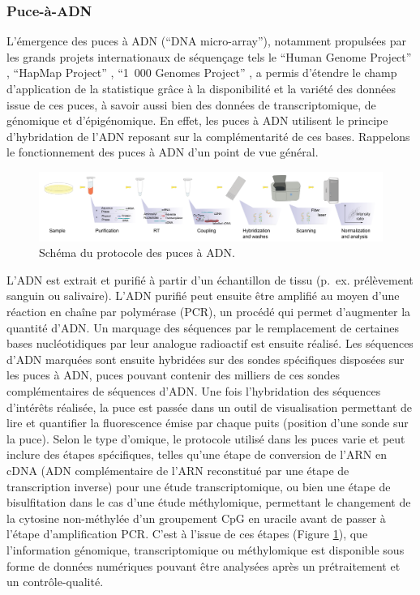 \documentclass[11pt,a4paper,notrimn]{krantz}
\theoremstyle{definition}
\theoremstyle{definition}
\theoremstyle{remark}
\begin{document}
\subsubsection{Puce-à-ADN}\label{puce-a-adn}

L'émergence des puces à ADN (``DNA micro-array''), notamment propulsées
par les grands projets internationaux de séquençage tels le ``Human
Genome Project'' \citep{sawicki_human_1993}, ``HapMap Project''
\citep{gibbs_international_2003}, ``1~000 Genomes Project''
\citep{siva_1000_2008, the_1000_genomes_project_consortium_global_2015},
a permis d'étendre le champ d'application de la statistique grâce à la
disponibilité et la variété des données issue de ces puces, à savoir
aussi bien des données de transcriptomique, de génomique et
d'épigénomique. En effet, les puces à ADN utilisent le principe
d'hybridation de l'ADN reposant sur la complémentarité de ces bases.
Rappelons le fonctionnement des puces à ADN d'un point de vue général.



\begin{figure}[!htb]

{\centering \includegraphics[width=6in]{FiguresTables/Microarray} 

}

\caption{Schéma du protocole des puces à ADN.}\label{fig:Microarray}
\end{figure}

L'ADN est extrait et purifié à partir d'un échantillon de tissu (p.~ex.
prélèvement sanguin ou salivaire). L'ADN purifié peut ensuite être
amplifié au moyen d'une réaction en chaîne par polymérase (PCR), un
procédé qui permet d'augmenter la quantité d'ADN. Un marquage des
séquences par le remplacement de certaines bases nucléotidiques par leur
analogue radioactif est ensuite réalisé. Les séquences d'ADN marquées
sont ensuite hybridées sur des sondes spécifiques disposées sur les
puces à ADN, puces pouvant contenir des milliers de ces sondes
complémentaires de séquences d'ADN. Une fois l'hybridation des séquences
d'intérêts réalisée, la puce est passée dans un outil de visualisation
permettant de lire et quantifier la fluorescence émise par chaque puits
(position d'une sonde sur la puce). Selon le type d'omique, le protocole
utilisé dans les puces varie et peut inclure des étapes spécifiques,
telles qu'une étape de conversion de l'ARN en cDNA (ADN complémentaire
de l'ARN reconstitué par une étape de transcription inverse) pour une
étude transcriptomique, ou bien une étape de bisulfitation dans le cas
d'une étude méthylomique, permettant le changement de la cytosine
non-méthylée d'un groupement CpG en uracile avant de passer à l'étape
d'amplification PCR. C'est à l'issue de ces étapes (Figure
\ref{fig:Microarray}), que l'information génomique, transcriptomique ou
méthylomique est disponible sous forme de données numériques pouvant
être analysées après un prétraitement et un contrôle-qualité.
\end{document}
